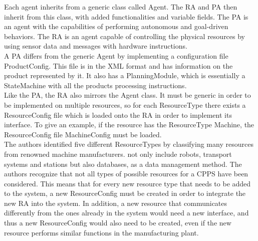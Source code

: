 Each agent inherits from a generic class called Agent. The \acrshort{RA} and \acrshort{PA} then inherit from this class, with added functionalities and variable fields. The \acrshort{PA} is an agent with the capabilities of performing autonomous and goal-driven behaviors. The \acrshort{RA} is an agent capable of controlling the physical resources by using sensor data and messages with hardware instructions.\\

A \acrshort{PA} differs from the generic Agent by implementing a configuration file ProductConfig. This file is in the \acrshort{XML} format and has information on the product represented by it. It also has a PlanningModule, which is essentially a StateMachine with all the products processing instructions.\\

Like the \acrshort{PA}, the \acrshort{RA} also mirrors the Agent class. It must be generic in order to be implemented on multiple resources, so for each ResourceType there exists a ResourceConfig file which is loaded onto the \acrshort{RA} in order to implement its interface. To give an example, if the resource has the ResourceType Machine, the ResourceConfig file MachineConfig must be loaded.\\

The authors identified five different ResourceTypes by classifying many resources from renowned machine manufacturers.  not only include robots, transport systems and stations but also databases, as a data management method. The authors recognize that not all types of possible resources for a \acrshort{CPPS} have been considered. This means that for every new resource type that needs to be added to the system, a new ResourceConfig must be created in order to integrate the new \acrshort{RA} into the system. In addition, a new resource that communicates differently from the ones already in the system would need a new interface, and thus a new ResourceConfig would also need to be created, even if the new resource performs similar functions in the manufacturing plant.\\


